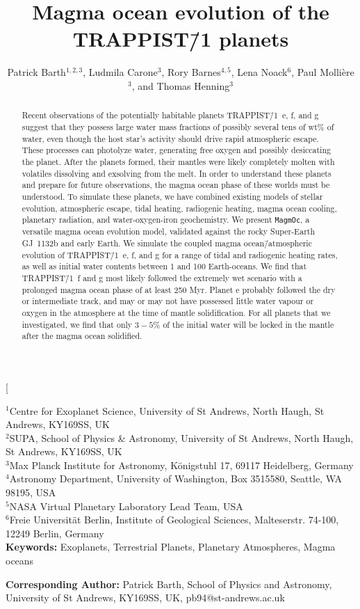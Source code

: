 \documentclass[paper=letterpaper,fontsize=12pt,oneside,twocolumn]{article}
\title{Magma ocean evolution of the TRAPPIST\=/1 planets}
\author{Patrick Barth$^{1,2,3}$, Ludmila Carone$^{3}$, Rory Barnes$^{4,5}$, Lena Noack$^{6}$, Paul Molli\`{e}re$^{3}$, and Thomas Henning$^{3}$}
\date{}
\newcommand{\magmoc}{\texttt{\footnotesize{MagmOc}}}
\begin{document}
 

\twocolumn[
\begin{@twocolumnfalse}
\maketitle

$^1$Centre for Exoplanet Science, University of St Andrews, North Haugh, St Andrews, KY169SS, UK \\
$^2$SUPA, School of Physics \& Astronomy, University of St Andrews, North Haugh, St Andrews, KY169SS, UK \\
$^3$Max Planck Institute for Astronomy, K\"onigstuhl 17, 69117 Heidelberg, Germany \\
$^4$Astronomy Department, University of Washington, Box 3515580, Seattle, WA 98195, USA \\
$^5$NASA Virtual Planetary Laboratory Lead Team, USA \\
$^6$Freie Universit\"at Berlin, Institute of Geological Sciences, Malteserstr. 74-100, 12249 Berlin, Germany \\

\textbf{Keywords:} Exoplanets, Terrestrial Planets, Planetary Atmospheres, Magma oceans

\textbf{Corresponding Author:} Patrick Barth, School of Physics and Astronomy, University of St Andrews, KY169SS, UK, pb94@st-andrews.ac.uk


\begin{abstract}

Recent observations of the potentially habitable planets TRAPPIST\=/1~e, f, and g suggest that they possess large water mass fractions of possibly several tens of wt\% of water, even though the host star's activity should drive rapid atmospheric escape. These processes can photolyze water, generating free oxygen and possibly desiccating the planet. After the planets formed, their mantles were likely completely molten with volatiles dissolving and exsolving from the melt. In order to understand these planets and prepare for future observations, the magma ocean phase of these worlds must be understood. To simulate these planets, we have combined existing models of stellar evolution, atmospheric escape, tidal heating, radiogenic heating, magma ocean cooling, planetary radiation, and water-oxygen-iron geochemistry. We present \magmoc{}, a versatile magma ocean evolution model, validated against the rocky Super-Earth GJ~1132b and early Earth. We simulate the coupled magma ocean\=/atmospheric evolution of TRAPPIST\=/1~e, f, and g for a range of tidal and radiogenic heating rates, as well as initial water contents between 1 and 100 Earth-oceans. We find that TRAPPIST\=/1~f and g most likely followed the extremely wet scenario with a prolonged magma ocean phase of at least 250 Myr. Planet e probably followed the dry or intermediate track, and may or may not have possessed little water vapour or oxygen in the atmosphere at the time of mantle solidification. For all planets that we investigated, we find that only $3-5\%$ of the initial water will be locked in the mantle after the magma ocean solidified. 
   

\end{abstract}
\end{@twocolumnfalse}
\end{document}
